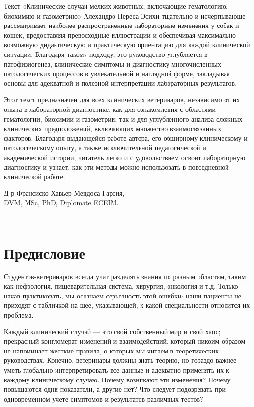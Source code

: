 \documentclass[a4paper,12pt]{book}
\begin{document}
Текст «Клинические случаи мелких животных, включающие гематологию, биохимию и газометрию» Алехандро Переса-Эсихи тщательно и исчерпывающе рассматривает наиболее распространенные лабораторные изменения у собак и кошек, предоставляя превосходные иллюстрации и обеспечивая максимально возможную дидактическую и практическую ориентацию для каждой клинической ситуации. Благодаря такому подходу, это руководство углубляется в патофизиогенез, клинические симптомы и диагностику многочисленных патологических процессов в увлекательной и наглядной форме, закладывая основы для адекватной и полезной интерпретации лабораторных результатов.

Этот текст предназначен для всех клинических ветеринаров, независимо от их опыта в лабораторной диагностике, как для ознакомления с областями гематологии, биохимии и газометрии, так и для углубленного анализа сложных клинических предположений, включающих множество взаимосвязанных факторов. Благодаря выдающейся работе автора, его обширному клиническому и патологическому опыту, а также исключительной педагогической и академической истории, читатель легко и с удовольствием освоит лабораторную диагностику и узнает, как эти методы можно использовать в повседневной клинической работе.

\begin{flushright}
Д-р Франсиско Хавьер Мендоса Гарсия,\\
DVM, MSc, PhD, Diplomate ECEIM.
\end{flushright}

\newpage
~
\chapter*{Предисловие}
Студентов-ветеринаров всегда учат разделять знания по разным областям, таким как нефрология, пищеварительная система, хирургия, онкология и т.д. Только начав практиковать, мы осознаем серьезность этой ошибки: наши пациенты не приходят с табличкой на шее, указывающей, к какой специальности относится их проблема.

Каждый клинический случай — это свой собственный мир и свой хаос; прекрасный конгломерат изменений и взаимодействий, который никоим образом не напоминает жесткие правила, о которых мы читаем в теоретических руководствах. Конечно, ветеринары должны знать теорию, но гораздо важнее уметь глобально интерпретировать все данные и адекватно применять их к каждому клиническому случаю. Почему возникают эти изменения? Почему повышаются одни показатели, а другие нет? Что следует подозревать при одновременном учете симптомов и результатов различных тестов?
\end{document}
